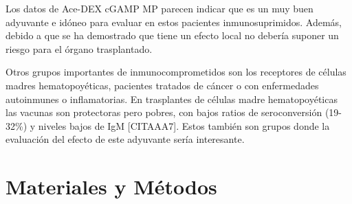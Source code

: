 \documentclass[a4paper,11pt]{article}
\begin{document}
Los datos de Ace-DEX cGAMP MP parecen indicar que es un muy buen adyuvante e idóneo para evaluar en estos pacientes inmunosuprimidos. Además, debido a que se ha demostrado que tiene un efecto local no debería suponer un riesgo para el órgano trasplantado. 

Otros grupos importantes de inmunocomprometidos son los receptores de células madres hematopoyéticas, pacientes tratados de cáncer o con enfermedades autoinmunes o inflamatorias. En trasplantes de células madre hematopoyéticas las vacunas son protectoras pero pobres, con bajos ratios de seroconversión (19-32\%) y niveles bajos de IgM [CITAAA7]. Estos también son grupos donde la evaluación del efecto de este adyuvante sería interesante.

\section{Materiales y Métodos}
\end{document}
